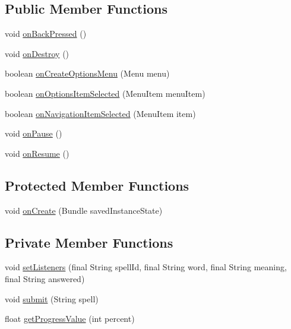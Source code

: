 \subsection*{Public Member Functions}
\begin{DoxyCompactItemize}
\item 
void \hyperlink{classorg_1_1buildmlearn_1_1learnspellings_1_1activities_1_1MainActivity_abf8abf1cb81979d3a9b8ae9c3d19c363}{on\+Back\+Pressed} ()
\item 
void \hyperlink{classorg_1_1buildmlearn_1_1learnspellings_1_1activities_1_1MainActivity_ae6c6ada054677d6ab2f431828f57a510}{on\+Destroy} ()
\item 
boolean \hyperlink{classorg_1_1buildmlearn_1_1learnspellings_1_1activities_1_1MainActivity_a60e9e6807173ac4c7eb801447ed70be5}{on\+Create\+Options\+Menu} (Menu menu)
\item 
boolean \hyperlink{classorg_1_1buildmlearn_1_1learnspellings_1_1activities_1_1MainActivity_abc15d4d90cf028f0d8cf8e97152fcd40}{on\+Options\+Item\+Selected} (Menu\+Item menu\+Item)
\item 
boolean \hyperlink{classorg_1_1buildmlearn_1_1learnspellings_1_1activities_1_1MainActivity_a49872e54962024690c63a0aed9e37215}{on\+Navigation\+Item\+Selected} (Menu\+Item item)
\item 
void \hyperlink{classorg_1_1buildmlearn_1_1learnspellings_1_1activities_1_1MainActivity_a944ed7e511f23d54a257d2ba77231bb6}{on\+Pause} ()
\item 
void \hyperlink{classorg_1_1buildmlearn_1_1learnspellings_1_1activities_1_1MainActivity_a7ee22591a26231c2561ce03ac6a759fe}{on\+Resume} ()
\end{DoxyCompactItemize}
\subsection*{Protected Member Functions}
\begin{DoxyCompactItemize}
\item 
void \hyperlink{classorg_1_1buildmlearn_1_1learnspellings_1_1activities_1_1MainActivity_a54a953a3afc87ab5323b331a9c92f9c1}{on\+Create} (Bundle saved\+Instance\+State)
\end{DoxyCompactItemize}
\subsection*{Private Member Functions}
\begin{DoxyCompactItemize}
\item 
void \hyperlink{classorg_1_1buildmlearn_1_1learnspellings_1_1activities_1_1MainActivity_a58055ebdf9a980850499798aabeff5f6}{set\+Listeners} (final String spell\+Id, final String word, final String meaning, final String answered)
\item 
void \hyperlink{classorg_1_1buildmlearn_1_1learnspellings_1_1activities_1_1MainActivity_af6f16035a599fbce3446ce7bf0c05825}{submit} (String spell)
\item 
float \hyperlink{classorg_1_1buildmlearn_1_1learnspellings_1_1activities_1_1MainActivity_a58e479b8a17ef60e4f39340f4477fe2a}{get\+Progress\+Value} (int percent)
\end{DoxyCompactItemize}
